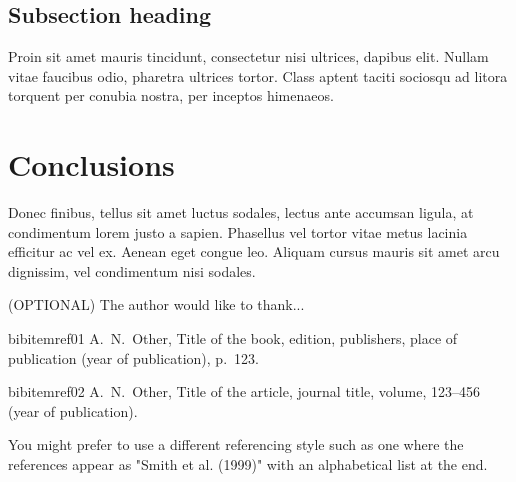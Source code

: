 \documentclass[12pt, onecolumn]{revtex4}    %
\begin{document}
\subsection{Subsection heading}

Proin sit amet mauris tincidunt, consectetur nisi ultrices, dapibus elit. Nullam vitae faucibus odio, pharetra ultrices tortor. Class aptent taciti sociosqu ad litora torquent per conubia nostra, per inceptos himenaeos. 

\section{Conclusions}
Donec finibus, tellus sit amet luctus sodales, lectus ante accumsan ligula, at condimentum lorem justo a sapien. Phasellus vel tortor vitae metus lacinia efficitur ac vel ex. Aenean eget congue leo. Aliquam cursus mauris sit amet arcu dignissim, vel condimentum nisi sodales. 

\begin{acknowledgments}

(OPTIONAL) The author would like to thank...

\end{acknowledgments}

\begin{thebibliography}{}

bibitem{ref01} A.~N.~Other, Title of the book, edition, publishers, place of publication (year of publication), p.~123.   %

bibitem{ref02} A.~N.~Other, Title of the article, journal title, volume, 123--456 (year of publication).   %

 You might prefer to use a different referencing style such as one where the references appear as "Smith et al. (1999)" with an alphabetical list at the end.

\end{thebibliography} 
\end{document}
